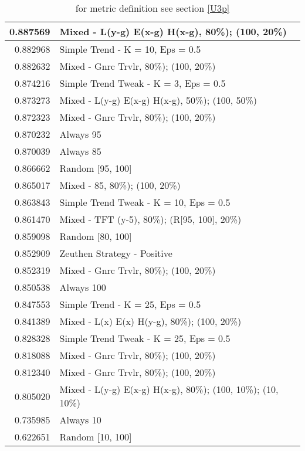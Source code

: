 \begin{table}[!hbtp]
\begin{footnotesize}
\begin{tabular}{|r|l|}
0.887569 & Mixed - {L(y-g) E(x-g) H(x-g), 80\%); (100, 20\%)}\\ \hline
0.882968 & Simple Trend - K = 10, Eps = 0.5\\ \hline
0.882632 & Mixed - {Gnrc Trvlr, 80\%); (100, 20\%)}\\ \hline
0.874216 & Simple Trend Tweak - K = 3, Eps = 0.5\\ \hline
0.873273 & Mixed - {L(y-g) E(x-g) H(x-g), 50\%); (100, 50\%)}\\ \hline
0.872323 & Mixed - {Gnrc Trvlr, 80\%); (100, 20\%)}\\ \hline
0.870232 & Always 95\\ \hline
0.870039 & Always 85\\ \hline
0.866662 & Random [95, 100]\\ \hline
0.865017 & Mixed - {85, 80\%); (100, 20\%)}\\ \hline
0.863843 & Simple Trend Tweak - K = 10, Eps = 0.5\\ \hline
0.861470 & Mixed - {TFT (y-5), 80\%); (R[95, 100], 20\%)}\\ \hline
0.859098 & Random [80, 100]\\ \hline
0.852909 & Zeuthen Strategy - Positive\\ \hline
0.852319 & Mixed - {Gnrc Trvlr, 80\%); (100, 20\%)}\\ \hline
0.850538 & Always 100\\ \hline
0.847553 & Simple Trend - K = 25, Eps = 0.5\\ \hline
0.841389 & Mixed - {L(x) E(x) H(y-g), 80\%); (100, 20\%)}\\ \hline
0.828328 & Simple Trend Tweak - K = 25, Eps = 0.5\\ \hline
0.818088 & Mixed - {Gnrc Trvlr, 80\%); (100, 20\%)}\\ \hline
0.812340 & Mixed - {Gnrc Trvlr, 80\%); (100, 20\%)}\\ \hline
0.805020 & Mixed - {L(y-g) E(x-g) H(x-g), 80\%); (100, 10\%); (10, 10\%)}\\ \hline
0.735985 & Always 10\\ \hline
0.622651 & Random [10, 100]\\ \hline
\end{tabular}
\caption{for metric definition see section \eqref{U3p}}
\end{footnotesize}
\end{table}

